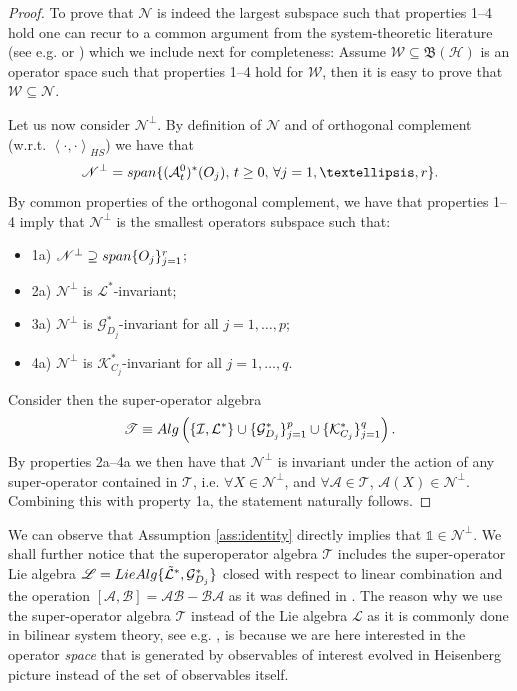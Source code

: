 \documentclass[aihp,12pt]{imsart}
\newcommand{\Ac}{\mathcal{A}}
\newcommand{\Bc}{\mathcal{B}}
\newcommand{\Gc}{\mathcal{G}}
\newcommand{\Hc}{\mathcal{H}}
\newcommand{\Ic}{\mathcal{I}}
\newcommand{\Kc}{\mathcal{K}}
\newcommand{\Lc}{\mathcal{L}}
\newcommand{\Ls}{\mathscr{L}}
\newcommand{\Ns}{\mathscr{N}}
\newcommand{\Ws}{\mathscr{W}}
\newcommand{\Ts}{\mathscr{T}}
\newcommand{\Bf}{\mathfrak{B}}
\newcommand{\one}{\mathbb{1}}
\newcommand{\Span}{{\rm span}}
\newcommand{\inner}[2]{\left< #1,#2 \right>}
\theoremstyle{theorem}
\theoremstyle{definition}
\theoremstyle{remark}
\begin{document}
\begin{proof}
To prove that $\Ns$ is indeed the largest subspace such that properties 1--4 hold one can recur to a common argument from the system-theoretic literature (see e.g. \cite[Property 2.6.8]{marrobasile} or \cite{kalman,kalman1969topics,wonham,vanhandel2008stabilityquantummarkovfilters}) which we include next for completeness: Assume $\Ws\subseteq\Bf(\Hc)$ is an operator space such that properties 1--4 hold for $\Ws$, then it is easy to prove that $\Ws\subseteq\Ns$. 

Let us now consider $\Ns^\perp$. By definition of $\Ns$ and of orthogonal complement (w.r.t. $\inner{\cdot}{\cdot}_{HS}$) we have that 
\[\Ns^\perp = \Span\{({\mathcal A_t^0})^* (O_j), \, t\geq0,\,\forall j=1,\dots,r \}.\]
By common properties of the orthogonal complement, we have that properties 1--4 imply that $\Ns^\perp$ is the smallest operators subspace such that: \begin{itemize}\item1a) $\Ns^\perp \supseteq \Span\{O_j\}_{j=1}^r$; \item 2a) \(\Ns^\perp\) is $\Lc^*$-invariant; \item 3a) \(\Ns^\perp\) is $\Gc_{D_j}^*$-invariant for all $j=1,\dots,p$; 
\item 4a) \(\Ns^\perp\) is $\Kc_{C_j}^*$-invariant for all $j=1,\dots,q$.
\end{itemize}
Consider then the super-operator algebra $$\Ts \equiv {\rm Alg}\left(\{\Ic, {\Lc}^*\}\cup\{\Gc_{D_j}^*\}_{j=1}^p \cup\{\Kc_{C_j}^*\}_{j=1}^q \right).$$ By properties 2a--4a we then have that $\Ns^\perp$ is invariant under the action of any super-operator contained in $\Ts$, i.e. $\forall X\in\Ns^\perp$, and $\forall\Ac\in\Ts$, $\Ac(X)\in\Ns^\perp$. Combining this with property 1a, the statement naturally follows.
\end{proof}


We can observe that Assumption \ref{ass:identity} directly implies that $\one\in\Ns^\perp$. 
We shall further notice that the superoperator algebra $\Ts$ includes the super-operator Lie algebra $\Ls = {\rm LieAlg}\{\Tilde{\Lc}^*,\Gc_{D_j}^*\}$ closed with respect to linear combination and the operation $[\Ac,\Bc] = \Ac\Bc-\Bc\Ac$ as it was defined in \cite{amini2019estimation}. The reason why we use the super-operator algebra $\Ts$ instead of the Lie algebra $\Ls$ as it is commonly done in bilinear system theory, see e.g. \cite{elliott2009bilinear}, is because we are here interested in the operator {\em space} that is generated by observables of interest evolved in Heisenberg picture instead of the set of observables itself. 
\end{document}
